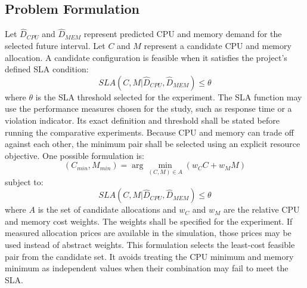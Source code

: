 \documentclass[12pt,a4paper]{report}
\begin{document}
\subsection{Problem Formulation}
Let $\hat{D}_{CPU}$ and $\hat{D}_{MEM}$ represent predicted CPU and memory demand for the selected future interval. Let $C$ and $M$ represent a candidate CPU and memory allocation.
A candidate configuration is feasible when it satisfies the project's defined SLA condition:
\begin{equation}
SLA(C, M | \hat{D}_{CPU}, \hat{D}_{MEM}) \le \theta
\end{equation}
where $\theta$ is the SLA threshold selected for the experiment. The SLA function may use the performance measures chosen for the study, such as response time or a violation indicator. Its exact definition and threshold shall be stated before running the comparative experiments.
Because CPU and memory can trade off against each other, the minimum pair shall be selected using an explicit resource objective. One possible formulation is:
\begin{equation}
(C_{min}, M_{min}) = \arg \min_{(C,M) \in A} (w_{C}C + w_{M}M)
\end{equation}
subject to:
\begin{equation}
SLA(C, M | \hat{D}_{CPU}, \hat{D}_{MEM}) \le \theta
\end{equation}
where $A$ is the set of candidate allocations and $w_{C}$ and $w_{M}$ are the relative CPU and memory cost weights. The weights shall be specified for the experiment. If measured allocation prices are available in the simulation, those prices may be used instead of abstract weights.
This formulation selects the least-cost feasible pair from the candidate set. It avoids treating the CPU minimum and memory minimum as independent values when their combination may fail to meet the SLA.
\lipsum[62-65]
\end{document}
